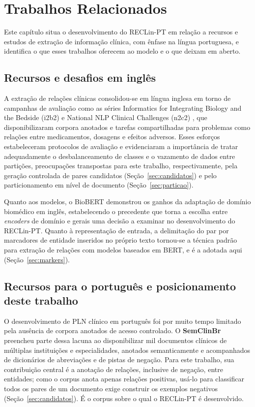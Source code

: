 \chapter[Trabalhos Relacionados]{Trabalhos Relacionados}
\label{cap:relacionados}

Este capítulo situa o desenvolvimento do RECLin-PT em relação a recursos e estudos de
extração de informação clínica, com ênfase na língua portuguesa, e identifica o que
esses trabalhos oferecem ao modelo e o que deixam em aberto.

\section{Recursos e desafios em inglês}

A extração de relações clínicas consolidou-se em língua inglesa em torno de
campanhas de avaliação como as séries \foreignlanguage{english}{Informatics for
Integrating Biology and the Bedside} (i2b2) e \foreignlanguage{english}{National
NLP Clinical Challenges} (n2c2) \cite{uzuner_2011_i2b2}, que disponibilizaram
corpora anotados e tarefas compartilhadas para problemas como relações entre
medicamentos, dosagens e efeitos adversos. Esses esforços estabeleceram protocolos
de avaliação e evidenciaram a importância de tratar adequadamente o desbalanceamento
de classes e o vazamento de dados entre partições, preocupações transpostas para
este trabalho, respectivamente, pela geração controlada de pares candidatos
(Seção~\ref{sec:candidatos}) e pelo particionamento em nível de documento
(Seção~\ref{sec:particao}).

Quanto aos modelos, o BioBERT \cite{lee_2020_biobert} demonstrou os
ganhos da adaptação de domínio biomédico em inglês, estabelecendo o precedente que
torna a escolha entre \emph{encoders} de domínio e gerais uma decisão a examinar no
desenvolvimento do RECLin-PT. Quanto à representação de entrada,
a delimitação do par por marcadores de entidade inseridos no próprio texto
\cite{soares_2019_markers} tornou-se a técnica padrão para extração de relações com
modelos baseados em \foreignlanguage{english}{BERT}, e é a adotada aqui
(Seção~\ref{sec:markers}).

\section{Recursos para o português e posicionamento deste trabalho}
\label{sec:recursos_pt}

O desenvolvimento de PLN clínico em português foi por muito tempo limitado pela
ausência de corpora anotados de acesso controlado. O \textbf{SemClinBr}
\cite{oliveira_2022_semclinbr} preencheu parte dessa lacuna ao disponibilizar mil
documentos clínicos de múltiplas instituições e especialidades, anotados
semanticamente e acompanhados de dicionários de abreviações e de pistas de negação.
Para este trabalho, sua contribuição central é a anotação de relações, inclusive de
negação, entre entidades; como o corpus anota apenas relações positivas, usá-lo para
classificar todos os pares de um documento exige construir os exemplos negativos
(Seção~\ref{sec:candidatos}). É o corpus sobre o qual o RECLin-PT é desenvolvido.

